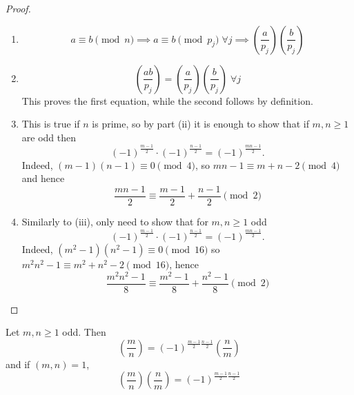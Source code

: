 \documentclass{article}
\newcommand{\legendre}[2]{\genfrac{(}{)}{}{}{#1}{#2}}
\begin{document}
\begin{proof}
    \begin{enumerate}[label=(\roman*)]
        \item
            \begin{equation*}
                a \equiv b \pmod{n} \implies a \equiv b \pmod{p_j} \; \forall j \implies \legendre{a}{p_j} \legendre{b}{p_j}
            \end{equation*}
        \item
            \begin{equation*}
                \legendre{ab}{p_j} = \legendre{a}{p_j} \legendre{b}{p_j} \; \forall j
            \end{equation*}
            This proves the first equation, while the second follows by definition.
        \item This is true if $n$ is prime, so by part (ii) it is enough to show that if $m, n \geq 1$ are odd then
            \begin{equation*}
                (-1)^\frac{m-1}{2} \cdot (-1)^\frac{n-1}{2} = (-1)^\frac{mn-1}{2}.
            \end{equation*}
            Indeed, $(m-1)(n-1) \equiv 0 \pmod{4}$, so $mn-1 \equiv m+n-2 \pmod{4}$ and hence
            \begin{equation*}
                \frac{mn-1}{2} \equiv \frac{m-1}{2} + \frac{n-1}{2} \pmod{2}
            \end{equation*}
        \item Similarly to (iii), only need to show that for $m, n \geq 1$ odd
            \begin{equation*}
                (-1)^\frac{m-1}{2} \cdot (-1)^\frac{n-1}{2} = (-1)^\frac{mn-1}{2}.
            \end{equation*}
            Indeed, $(m^2 - 1)(n^2 - 1) \equiv 0 \pmod{16}$ so $m^2 n^2 - 1 \equiv m^2 + n^2 - 2 \pmod{16}$, hence
            \begin{equation*}
                \frac{m^2n^2-1}{8} \equiv \frac{m^2-1}{8} + \frac{n^2-1}{8} \pmod{2}
            \end{equation*}
    \end{enumerate}
\end{proof}

\begin{nthm}\label{thm:3.6}
    Let $m, n \geq 1$ odd. Then
    \begin{equation*}
        \legendre{m}{n} = (-1)^{\frac{m-1}{2} \frac{n-1}{2}} \legendre{n}{m}
    \end{equation*}
    and if $(m, n) = 1$,
    \begin{equation*}
        \legendre{m}{n} \legendre{n}{m} = (-1)^{\frac{m-1}{2} \frac{n-1}{2}}
    \end{equation*}
\end{nthm}
\end{document}

